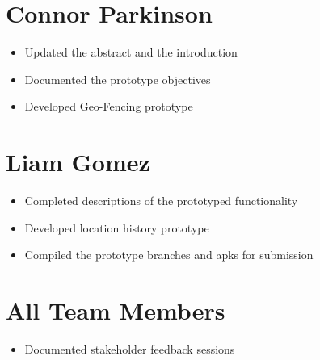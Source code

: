 \documentclass{scrreprt}
\begin{document}
	\section{Connor Parkinson}
		\begin{itemize}
			\item Updated the abstract and the introduction
			\item Documented the prototype objectives
			\item Developed Geo-Fencing prototype
		\end{itemize}
	\section{Liam Gomez}
		\begin{itemize}
			\item Completed descriptions of the prototyped functionality
			\item Developed location history prototype
			\item Compiled the prototype branches and apks for submission
		\end{itemize}
	\section{All Team Members}
		\begin{itemize}
			\item Documented stakeholder feedback sessions
		\end{itemize}
\end{document}
